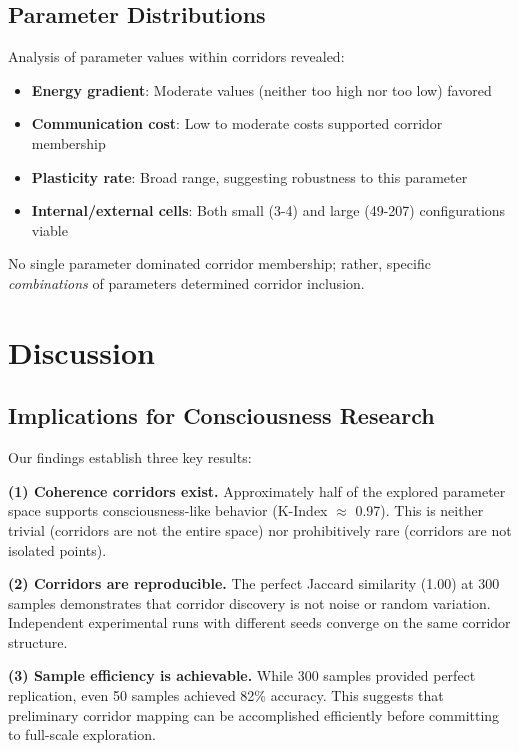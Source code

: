 \documentclass[10pt,letterpaper]{article}
\begin{document}
\subsection*{Parameter Distributions}

Analysis of parameter values within corridors revealed:

\begin{itemize}
    \item \textbf{Energy gradient}: Moderate values (neither too high nor too low) favored
    \item \textbf{Communication cost}: Low to moderate costs supported corridor membership
    \item \textbf{Plasticity rate}: Broad range, suggesting robustness to this parameter
    \item \textbf{Internal/external cells}: Both small (3-4) and large (49-207) configurations viable
\end{itemize}

No single parameter dominated corridor membership; rather, specific \textit{combinations} of parameters determined corridor inclusion.

\section*{Discussion}

\subsection*{Implications for Consciousness Research}

Our findings establish three key results:

\textbf{(1) Coherence corridors exist.} Approximately half of the explored parameter space supports consciousness-like behavior (K-Index $\approx$ 0.97). This is neither trivial (corridors are not the entire space) nor prohibitively rare (corridors are not isolated points).

\textbf{(2) Corridors are reproducible.} The perfect Jaccard similarity (1.00) at 300 samples demonstrates that corridor discovery is not noise or random variation. Independent experimental runs with different seeds converge on the same corridor structure.

\textbf{(3) Sample efficiency is achievable.} While 300 samples provided perfect replication, even 50 samples achieved 82\% accuracy. This suggests that preliminary corridor mapping can be accomplished efficiently before committing to full-scale exploration.
\end{document}

